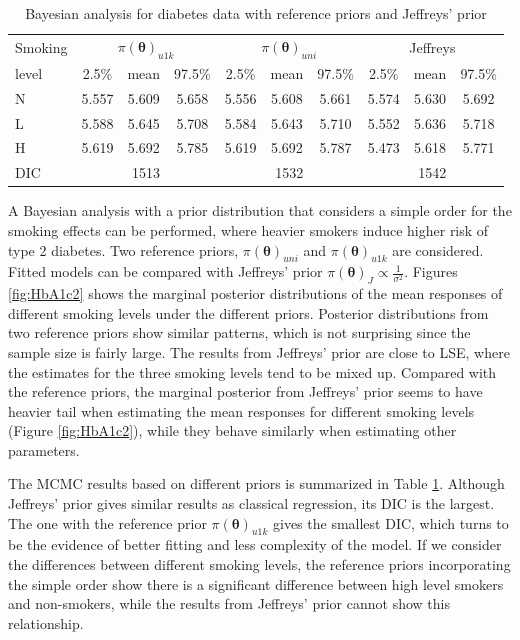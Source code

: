 \documentclass[Proceedings]{ascelike}
\begin{document}
\begin{table}[h!]
  \centering
  \caption{Bayesian analysis for diabetes data with reference priors and Jeffreys' prior}
\begin{tabular}{|l|c|c|c|c|c|c|c|c|c|}
    \hline
Smoking & \multicolumn{3}{|c|}{$\pi(\pmb\theta)_{u1k}$} &\multicolumn{3}{|c|}{$\pi(\pmb\theta)_{uni}$}&\multicolumn{3}{|c|}{Jeffreys}\\
\cline{2-10}
level & 2.5\% & mean & 97.5\% & 2.5\% & mean & 97.5\% & 2.5\% & mean & 97.5\%  \\
\hline
N & 5.557 & 5.609 &  5.658 & 5.556 & 5.608 &  5.661 & 5.574 & 5.630 & 5.692 \\
L & 5.588 & 5.645 & 5.708 & 5.584 & 5.643 & 5.710 & 5.552 & 5.636 &  5.718  \\
H & 5.619 & 5.692 & 5.785 & 5.619 & 5.692 & 5.787 & 5.473 & 5.618 & 5.771  \\
\hline
DIC& \multicolumn{3}{|c|}{1513} &\multicolumn{3}{|c|}{1532}&\multicolumn{3}{|c|}{1542}\\
\hline
\end{tabular}
\label{tab:mcmc}
\end{table}

A Bayesian analysis with a prior distribution that considers a simple order for the smoking effects can be performed, where heavier smokers induce higher risk of type 2 diabetes. Two reference priors, $\pi(\pmb\theta)_{uni}$ and $\pi(\pmb\theta)_{u1k}$ are considered. Fitted models can be compared with Jeffreys' prior $\pi(\pmb\theta)_{J}\propto \frac{1}{\sigma^2}$. Figures \ref{fig:HbA1c2} shows the marginal posterior distributions of the mean responses of different smoking levels under the different priors. Posterior distributions from two reference priors show similar patterns, which is not surprising since the sample size is fairly large. The results from Jeffreys' prior are close to LSE, where the estimates for the three smoking levels tend to be mixed up. Compared with the reference priors, the marginal posterior from Jeffreys' prior seems to have heavier tail when estimating the mean responses for different smoking levels (Figure \ref{fig:HbA1c2}), while they behave similarly when estimating other parameters. 

The MCMC results based on different priors is summarized in Table \ref{tab:mcmc}. Although Jeffreys' prior gives similar results as classical regression, its DIC is the largest. The one with the reference prior $\pi(\pmb\theta)_{u1k}$ gives the smallest DIC, which turns to be the evidence of better fitting and less complexity of the model. If we consider the differences between different smoking levels, the reference priors incorporating the simple order show there is a significant difference between high level smokers and non-smokers, while the results from Jeffreys' prior cannot show this relationship. 
\end{document}
